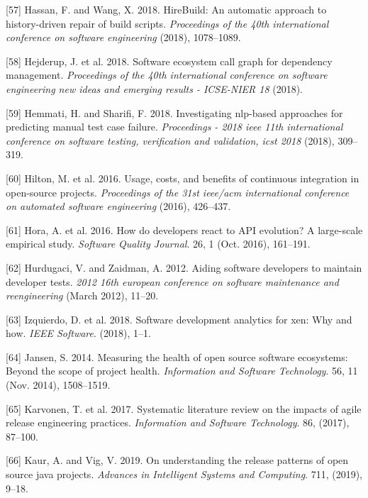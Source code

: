 \documentclass[]{book}
\begin{document}
\hypertarget{ref-hassan2018hirebuild}{}
{[}57{]} Hassan, F. and Wang, X. 2018. HireBuild: An automatic approach
to history-driven repair of build scripts. \emph{Proceedings of the 40th
international conference on software engineering} (2018), 1078--1089.

\hypertarget{ref-Hejderup2018}{}
{[}58{]} Hejderup, J. et al. 2018. Software ecosystem call graph for
dependency management. \emph{Proceedings of the 40th international
conference on software engineering new ideas and emerging results -
ICSE-NIER 18} (2018).

\hypertarget{ref-hemmati2018}{}
{[}59{]} Hemmati, H. and Sharifi, F. 2018. Investigating nlp-based
approaches for predicting manual test case failure. \emph{Proceedings -
2018 ieee 11th international conference on software testing,
verification and validation, icst 2018} (2018), 309--319.

\hypertarget{ref-hilton2016usage}{}
{[}60{]} Hilton, M. et al. 2016. Usage, costs, and benefits of
continuous integration in open-source projects. \emph{Proceedings of the
31st ieee/acm international conference on automated software
engineering} (2016), 426--437.

\hypertarget{ref-Hora2016}{}
{[}61{]} Hora, A. et al. 2016. How do developers react to API evolution?
A large-scale empirical study. \emph{Software Quality Journal}. 26, 1
(Oct. 2016), 161--191.

\hypertarget{ref-hurdugaci2012}{}
{[}62{]} Hurdugaci, V. and Zaidman, A. 2012. Aiding software developers
to maintain developer tests. \emph{2012 16th european conference on
software maintenance and reengineering} (March 2012), 11--20.

\hypertarget{ref-Izquierdo2018}{}
{[}63{]} Izquierdo, D. et al. 2018. Software development analytics for
xen: Why and how. \emph{IEEE Software}. (2018), 1--1.

\hypertarget{ref-Jansen2014}{}
{[}64{]} Jansen, S. 2014. Measuring the health of open source software
ecosystems: Beyond the scope of project health. \emph{Information and
Software Technology}. 56, 11 (Nov. 2014), 1508--1519.

\hypertarget{ref-karvonen2017a}{}
{[}65{]} Karvonen, T. et al. 2017. Systematic literature review on the
impacts of agile release engineering practices. \emph{Information and
Software Technology}. 86, (2017), 87--100.

\hypertarget{ref-kaur2019a}{}
{[}66{]} Kaur, A. and Vig, V. 2019. On understanding the release
patterns of open source java projects. \emph{Advances in Intelligent
Systems and Computing}. 711, (2019), 9--18.
\end{document}
